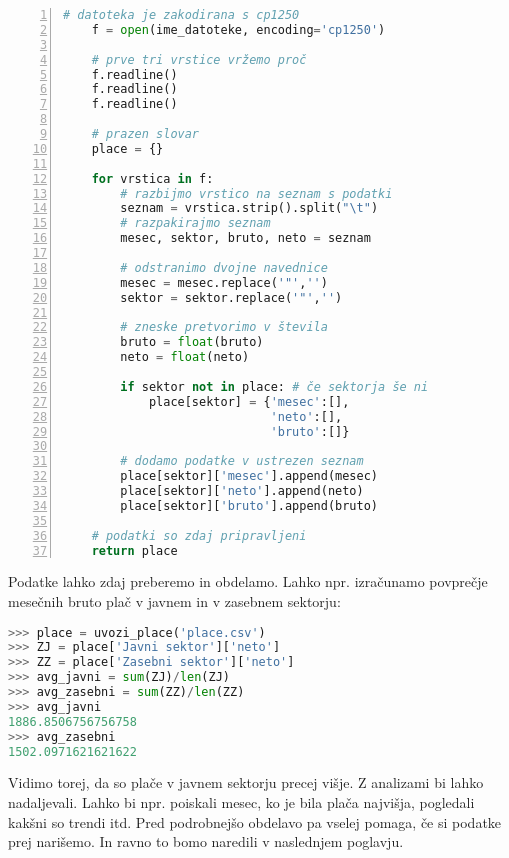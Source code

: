 \begin{resitev}
\begin{lstlisting}[language=Python, showstringspaces=false,numbers=left]
    # datoteka je zakodirana s cp1250
    f = open(ime_datoteke, encoding='cp1250')
    
    # prve tri vrstice vržemo proč
    f.readline()
    f.readline()
    f.readline()
    
    # prazen slovar
    place = {}
    
    for vrstica in f:
        # razbijmo vrstico na seznam s podatki
        seznam = vrstica.strip().split("\t")
        # razpakirajmo seznam
        mesec, sektor, bruto, neto = seznam
    
        # odstranimo dvojne navednice
        mesec = mesec.replace('"','')
        sektor = sektor.replace('"','')
    
        # zneske pretvorimo v števila
        bruto = float(bruto)
        neto = float(neto)

        if sektor not in place: # če sektorja še ni
            place[sektor] = {'mesec':[],
                             'neto':[], 
                             'bruto':[]}

        # dodamo podatke v ustrezen seznam
        place[sektor]['mesec'].append(mesec)
        place[sektor]['neto'].append(neto)
        place[sektor]['bruto'].append(bruto)
        
    # podatki so zdaj pripravljeni
    return place
\end{lstlisting}
\end{resitev}

Podatke lahko zdaj preberemo in obdelamo. Lahko npr. izračunamo povprečje mesečnih bruto plač v javnem in v zasebnem sektorju:
\begin{lstlisting}[language=Python, showstringspaces=false]
>>> place = uvozi_place('place.csv')
>>> ZJ = place['Javni sektor']['neto']
>>> ZZ = place['Zasebni sektor']['neto']
>>> avg_javni = sum(ZJ)/len(ZJ)
>>> avg_zasebni = sum(ZZ)/len(ZZ)
>>> avg_javni
1886.8506756756758
>>> avg_zasebni
1502.0971621621622
\end{lstlisting}

Vidimo torej, da so plače v javnem sektorju precej višje. Z analizami bi lahko nadaljevali. Lahko bi npr. poiskali mesec, ko je bila plača najvišja, pogledali kakšni so trendi itd. Pred podrobnejšo obdelavo pa vselej pomaga, če si podatke prej narišemo. In ravno to bomo naredili v naslednjem poglavju.
